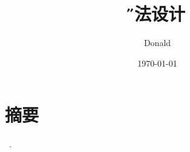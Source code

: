 \documentclass[12pt,twocolumn]{article}
\title{\H 算法设计}
\author{Donald}
\date{\E\today}
\begin{document}
\maketitle

\section{摘要}
~\cite{nobody}.


\renewcommand\refname{引用}

{}
\end{document}
